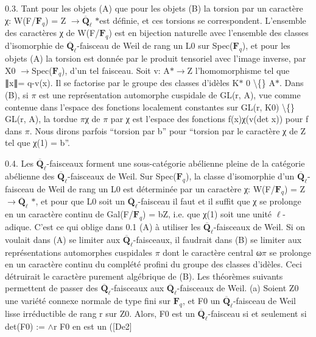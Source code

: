 \documentclass[11pt]{article}
\begin{document}
0.3. Tant pour les objets (A) que pour les objets (B) la torsion par un caractère χ: W(F/\(\mathbf F_q\)) = Z \(\to\)\(\overline{\mathbf Q}_\ell\) \(*\)est définie, et ces torsions se correspondent. L’ensemble des caractères χ de W(F/\(\mathbf F_q\)) est en bijection naturelle avec l’ensemble des classes d’isomorphie de \(\overline{\mathbf Q}_\ell\)-faisceau de Weil de rang un L0 sur Spec(\(\mathbf F_q\)), et pour les objets (A) la torsion est donnée par le produit tensoriel avec l’image inverse, par X0 \(\to\)Spec(\(\mathbf F_q\)), d’un tel faisceau. Soit v: A\(*\)\(\to\)Z l’homomorphisme tel que ∥x∥= q-v(x). Il se factorise par le groupe des classes d’idèles K\(*\) 0 \textbackslash\{\} A\(*\). Dans (B), si \(\pi\) est une représentation automorphe cuspidale de GL(r, A), vue comme contenue dans l’espace des fonctions localement constantes sur GL(r, K0) \textbackslash\{\} GL(r, A), la tordue \(\pi\)χ de \(\pi\) par χ est l’espace des fonctions f(x)χ(v(det x)) pour f dans \(\pi\). Nous dirons parfois “torsion par b” pour “torsion par le caractère χ de Z tel que χ(1) = b”. 

0.4. Les \(\overline{\mathbf Q}_\ell\)-faisceaux forment une sous-catégorie abélienne pleine de la catégorie abélienne des \(\overline{\mathbf Q}_\ell\)-faisceaux de Weil. Sur Spec(\(\mathbf F_q\)), la classe d’isomorphie d’un \(\overline{\mathbf Q}_\ell\)-faisceau de Weil de rang un L0 est déterminée par un caractère χ: W(F/\(\mathbf F_q\)) = Z \(\to\)\(\overline{\mathbf Q}_\ell\) \(*\), et pour que L0 soit un \(\overline{\mathbf Q}_\ell\)-faisceau il faut et il suffit que χ se prolonge en un caractère continu de Gal(F/\(\mathbf F_q\)) = bZ, i.e. que χ(1) soit une unité \(\ell\)-adique. C’est ce qui oblige dans 0.1 (A) à utiliser les \(\overline{\mathbf Q}_\ell\)-faisceaux de Weil. Si on voulait dans (A) se limiter aux \(\overline{\mathbf Q}_\ell\)-faisceaux, il faudrait dans (B) se limiter aux représentations automorphes cuspidales \(\pi\) dont le caractère central ω\(\pi\) se prolonge en un caractère continu du complété profini du groupe des classes d’idèles. Ceci détruirait le caractère purement algébrique de (B). Les théorèmes suivants permettent de passer des \(\overline{\mathbf Q}_\ell\)-faisceaux aux \(\overline{\mathbf Q}_\ell\)-faisceaux de Weil. (a) Soient Z0 une variété connexe normale de type fini sur \(\mathbf F_q\), et F0 un \(\overline{\mathbf Q}_\ell\)-faisceau de Weil lisse irréductible de rang r sur Z0. Alors, F0 est un \(\overline{\mathbf Q}_\ell\)-faisceau si et seulement si det(F0) := \(\wedge\)r F0 en est un ([De2] 
\end{document}
